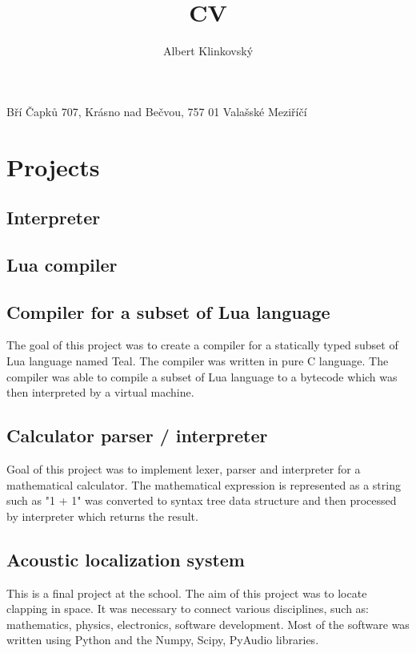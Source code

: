 \documentclass{article}
\renewcommand{\maketitle}{
    \begin{center}
        \Huge\bfseries
        \theauthor

    \end{center}
    \begin{center}
        Bří Čapků 707, Krásno nad Bečvou, 757 01 Valašské Meziříčí
    \end{center}
}
\begin{document}
\title{CV}
\author{Albert Klinkovský}

\maketitle



\section{Projects}

\subsection{Interpreter}

\subsection{Lua compiler}


\subsection{Compiler for a subset of Lua language}

The goal of this project was to create a compiler for a statically typed subset of Lua language named Teal. The compiler
was written in pure C language. The compiler was able to compile a subset of Lua language to a bytecode which was then
interpreted by a virtual machine.

\subsection{Calculator parser / interpreter}

Goal of this project was to implement lexer, parser and interpreter for a mathematical calculator. The mathematical
expression is represented as a string such as "1 + 1" was converted to syntax tree data structure and then processed
by interpreter which returns the result.

\subsection{Acoustic localization system}

This is a final project at the school. The aim of this project was to locate clapping in space.  It was necessary to
connect various disciplines, such as:  mathematics, physics, electronics, software development. Most of the software
was written using Python and the Numpy, Scipy, PyAudio libraries.
\end{document}
